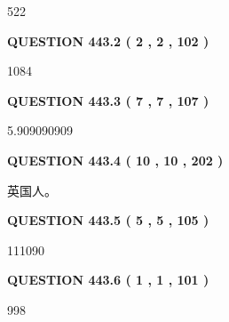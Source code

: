 \documentclass{ctexart}
\begin{document}
522
 
 
  
\vspace{0.2in}
  
{\textbf{\Large{QUESTION
443.2 
 ( 2 , 2 , 102 )
}}}
  
  
 
 
\noindent{}

1084
 
 
  
\vspace{0.2in}
  
{\textbf{\Large{QUESTION
443.3 
 ( 7 , 7 , 107 )
}}}
  
  
 
 
\noindent{}

5.909090909
 
 
  
\vspace{0.2in}
  
{\textbf{\Large{QUESTION
443.4 
 ( 10 , 10 , 202 )
}}}
  
  
 
 
\noindent{}
 
 
英国人。
 
 
 
 
  
\vspace{0.2in}
  
{\textbf{\Large{QUESTION
443.5 
 ( 5 , 5 , 105 )
}}}
  
  
 
 
\noindent{}

111090
 
 
  
\vspace{0.2in}
  
{\textbf{\Large{QUESTION
443.6 
 ( 1 , 1 , 101 )
}}}
  
  
 
 
\noindent{}

998
 
 
  
\vspace{0.2in}
  
\end{document}
